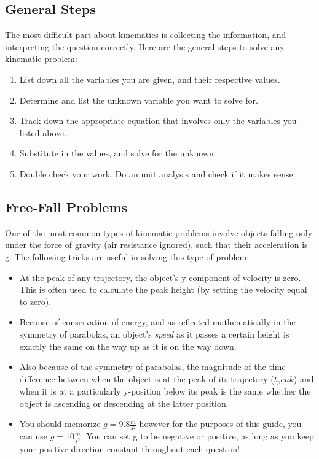 \subsection{General Steps}
The most difficult part about kinematics is collecting the information, and interpreting the question correctly. Here are the general steps to solve any kinematic problem:
\begin{enumerate}
  \item List down all the variables you are given, and their respective values. 
  \item Determine and list the unknown variable you want to solve for.
  \item Track down the appropriate equation that involves only the variables you listed above.
  \item Substitute in the values, and solve for the unknown.
  \item Double check your work. Do an unit analysis and check if it makes sense.
\end{enumerate}

\subsection{Free-Fall Problems}
One of the most common types of kinematic problems involve objects falling only under the force of gravity (air resistance ignored), such that their acceleration is g. The following tricks are useful in solving this type of problem:
\begin{itemize}
    \item At the peak of any trajectory, the object's y-component of velocity is zero. This is often used to calculate the peak height (by setting the velocity equal to zero).
    \item Because of conservation of energy, and as reflected mathematically in the symmetry of parabolas, an object's \emph{speed} as it passes a certain height is exactly the same on the way up as it is on the way down.
    \item Also because of the symmetry of parabolas, the magnitude of the time difference between when the object is at the peak of its trajectory ($t_peak$) and when it is at a particularly y-position below its peak is the same whether the object is ascending or descending at the latter position.
    \item You should memorize $g = 9.8\frac{m}{s^2}$ however for the purposes of this guide, you can use $g = 10\frac{m}{s^2}$. You can set g to be negative or positive, as long as you keep your positive direction constant throughout each question!
\end{itemize}